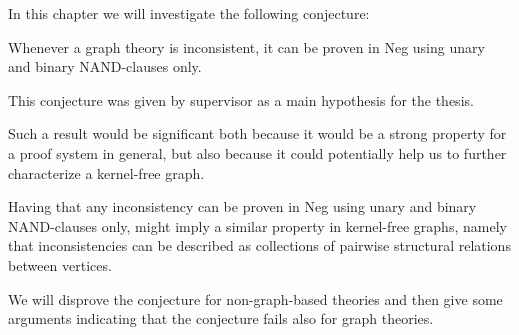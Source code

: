 In this chapter we will investigate the following conjecture:
\begin{conjecture}
  Whenever a graph theory is inconsistent, it can be proven in Neg using unary and binary NAND-clauses only.
\end{conjecture}
This conjecture was given by supervisor as a main hypothesis for the thesis.

Such a result would be significant both because it would be a strong property for a proof system in general, but also because it could potentially help us to further characterize a kernel-free graph.

Having that any inconsistency can be proven in Neg using unary and binary NAND-clauses only, might imply a similar property in kernel-free graphs, namely that inconsistencies can be described as collections of pairwise structural relations between vertices.

We will disprove the conjecture for non-graph-based theories and then give some arguments indicating that the conjecture fails also for graph theories.

